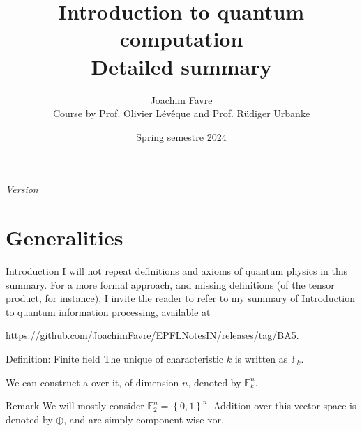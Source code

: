 \documentclass[a4paper]{article}
\title{Introduction to quantum computation \\ Detailed summary}
\author{Joachim Favre \\ Course by Prof. Olivier Lévêque and Prof. Rüdiger Urbanke}
\date{Spring semestre 2024}
\begin{document}
\maketitle

\setcounter{tocdepth}{5}

\tableofcontents

\initcurrdate
\def\setdateformat{Y--m--d}
\vspace*{\fill}
\vspace*{\fill}
\vspace*{\fill}
\begin{center}
    \textit{Version \printdate}
\end{center}
\vspace*{\fill}
\newpage

\section{Generalities}

\begin{parag}{Introduction}
    I will not repeat definitions and axioms of quantum physics in this summary. For a more formal approach, and missing definitions (of the tensor product, for instance), I invite the reader to refer to my summary of Introduction to quantum information processing, available at
    \begin{center}
        \url{https://github.com/JoachimFavre/EPFLNotesIN/releases/tag/BA5}.
    \end{center}
\end{parag}

\begin{parag}{Definition: Finite field}
    The unique  of characteristic $k$ is written as $\mathbb{F}_{k}$.

    We can construct a  over it, of dimension $n$, denoted by $\mathbb{F}_k^n$.

    \begin{subparag}{Remark}
        We will mostly consider $\mathbb{F}_{2}^n = \left\{0, 1\right\}^n$. Addition over this vector space is denoted by $\oplus$, and are simply component-wise xor.
    \end{subparag}
\end{parag}
\end{document}
